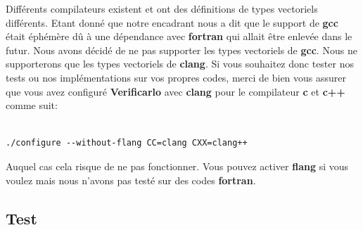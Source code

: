 \documentclass[11pt]{article}
\begin{document}
Différents compilateurs existent et ont des définitions de types vectoriels
différents. Etant donné que notre encadrant nous a dit que le support de \textbf{gcc}
était éphémère dû à une dépendance avec \textbf{fortran} qui allait être enlevée
dans le futur. Nous avons décidé de ne pas supporter les types vectoriels
de \textbf{gcc}. Nous ne supporterons que les types vectoriels de \textbf{clang}.
\vspace{5mm}
Si vous souhaitez donc tester nos tests ou nos implémentations sur vos propres
codes, merci de bien vous assurer que vous avez configuré \textbf{Verificarlo} avec
\textbf{clang} pour le compilateur \textbf{c} et \textbf{c++} comme suit:

\begin{verbatim}

./configure --without-flang CC=clang CXX=clang++

\end{verbatim}

Auquel cas cela risque de ne pas fonctionner. Vous pouvez activer \textbf{flang} si
vous voulez mais nous n'avons pas testé sur des codes \textbf{fortran}.

\subsection{Test}
\label{sec:orgee5d736}
\end{document}
